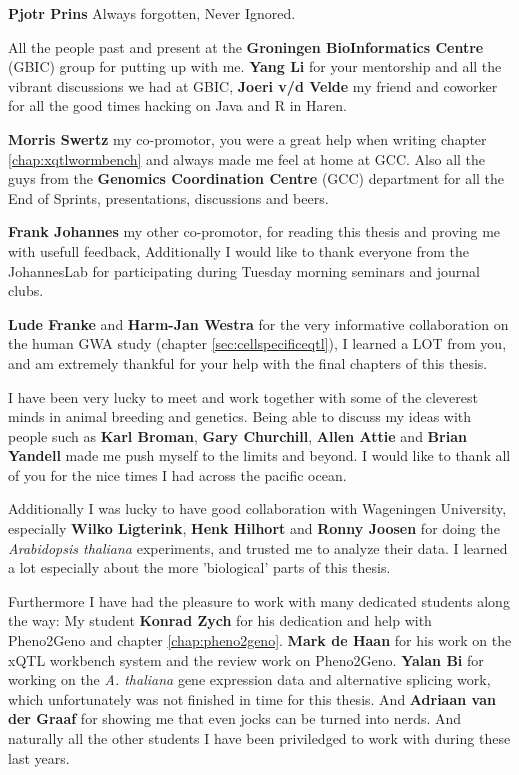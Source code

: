 {\bf Pjotr Prins} Always forgotten, Never Ignored. 

All the people past and present at the {\bf Groningen BioInformatics Centre} (GBIC) group 
for putting up with me. {\bf Yang Li} for your mentorship and all the vibrant discussions 
we had at GBIC, {\bf Joeri v/d Velde} my friend and coworker for all the good times hacking 
on Java and R in Haren. 

{\bf Morris Swertz} my co-promotor, you were a great help when writing chapter \ref{chap:xqtlwormbench} 
and always made me feel at home at GCC. Also all the guys from the {\bf Genomics Coordination 
Centre} (GCC) department for all the End of Sprints, presentations, discussions and beers.

{\bf Frank Johannes} my other co-promotor, for reading this thesis and proving me with usefull feedback, 
Additionally I would like to thank everyone from the JohannesLab for participating during Tuesday morning 
seminars and journal clubs.

{\bf Lude Franke} and {\bf Harm-Jan Westra} for the very informative collaboration on the 
human GWA study (chapter \ref{sec:cellspecificeqtl}), I learned a LOT from you, and am 
extremely thankful for your help with the final chapters of this thesis. 

I have been very lucky to meet and work together with some of the cleverest minds in animal breeding 
and genetics. Being able to discuss my ideas with people such as {\bf Karl Broman}, {\bf Gary Churchill}, 
{\bf Allen Attie} and {\bf Brian Yandell} made me push myself to the limits and beyond. I would like 
to thank all of you for the nice times I had across the pacific ocean.

Additionally I was lucky to have good collaboration with Wageningen University, especially {\bf Wilko 
Ligterink}, {\bf Henk Hilhort} and {\bf Ronny Joosen} for doing the \emph{Arabidopsis thaliana} 
experiments, and trusted me to analyze their data. I learned a lot especially about the more 'biological' 
parts of this thesis.

Furthermore I have had the pleasure to work with many dedicated students along the way: 
My student {\bf Konrad Zych} for his dedication and help with Pheno2Geno and chapter \ref{chap:pheno2geno}. 
{\bf Mark de Haan} for his work on the xQTL workbench system and the review work on Pheno2Geno.
{\bf Yalan Bi} for working on the \emph{A. thaliana} gene expression data and alternative splicing 
work, which unfortunately was not finished in time for this thesis. And {\bf Adriaan van der Graaf} for 
showing me that even jocks can be turned into nerds. And naturally all the other students I have been 
priviledged to work with during these last years.

